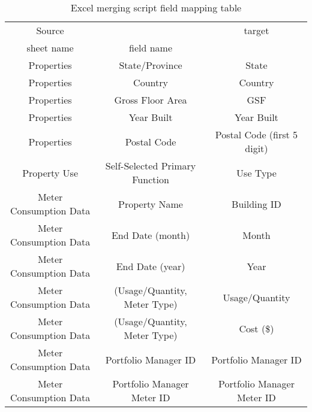 \documentclass[12pt]{article}
\begin{document}
\begin{table}[h!]
  \scriptsize
\centering
\caption{Excel merging script field mapping table}
\label{tab:mapFieldNew}
\begin{tabular}{c | c | c}%
  \hline
Source                 &                              & target                                         \\
sheet name             & field name                   &                                                          \\
  \hline
  \hline
Properties             & State/Province               & State                                                    \\
  \hline
Properties             & Country               & Country\\
  \hline
Properties             & Gross Floor Area             & GSF                                                      \\
  \hline
Properties             & Year Built                   & Year Built                                               \\
  \hline
Properties             & Postal Code                  & Postal Code (first 5 digit)                            \\ 
  \hline
Property Use & Self-Selected Primary Function         & Use Type                    \\ 
  \hline
  \hline
Meter Consumption Data & Property Name                & Building ID                                              \\
  \hline
Meter Consumption Data & End Date (month)             & Month                                                    \\
  \hline
Meter Consumption Data & End Date (year)             & Year                                                     \\
  \hline
Meter Consumption Data & (Usage/Quantity, Meter Type) & Usage/Quantity\\
  \hline
Meter Consumption Data & (Usage/Quantity, Meter Type) & Cost (\$)                    \\
  \hline
Meter Consumption Data & Portfolio Manager ID         & Portfolio Manager ID                                     \\
  \hline
Meter Consumption Data & Portfolio Manager Meter ID   & Portfolio Manager Meter ID                               \\
  \hline
  \hline
\end{tabular}
\end{table}
\end{document}
